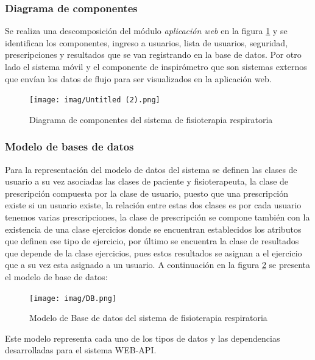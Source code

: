 \documentclass[12pt]{article}
\begin{document}
\subsubsection{Diagrama de componentes}

Se realiza una descomposición del módulo \textit{aplicación web} en la figura \ref{13}  y se identifican los componentes, ingreso a usuarios, lista de usuarios, seguridad, prescripciones y resultados que se van registrando en la base de datos. Por otro lado el sistema móvil y el componente de inspirómetro que son sistemas externos que envían los datos de flujo para ser visualizados en la aplicación web.

\begin{figure}[ht]
\centering
\texttt{[image: imag/Untitled (2).png]}
\caption{Diagrama de componentes del sistema de fisioterapia respiratoria}
\label{13}
\end{figure}
\FloatBarrier




\newpage

\subsubsection{Modelo de bases de datos}

Para la representación del modelo de datos del sistema se definen las clases de usuario a su vez asociadas las clases de paciente y fisioterapeuta, la clase de prescripción compuesta por la clase de usuario, puesto que una prescripción existe si un usuario existe, la relación entre estas dos clases es por cada usuario tenemos varias prescripciones, la clase de prescripción se compone también con la existencia de una clase ejercicios donde se encuentran establecidos los atributos que definen ese tipo de ejercicio, por último se encuentra la clase de resultados que depende de la clase ejercicios, pues estos resultados se asignan a el ejercicio que a su vez esta asignado a un usuario. A continuación en la figura \ref{14} se presenta el modelo de base de datos:


\begin{figure}[ht]
\centering
\texttt{[image: imag/DB.png]}
\caption{Modelo de Base de datos del sistema de fisioterapia respiratoria}
\label{14}
\end{figure}
\FloatBarrier


Este modelo representa cada uno de los tipos de datos y las dependencias desarrolladas para el sistema WEB-API.
\end{document}
